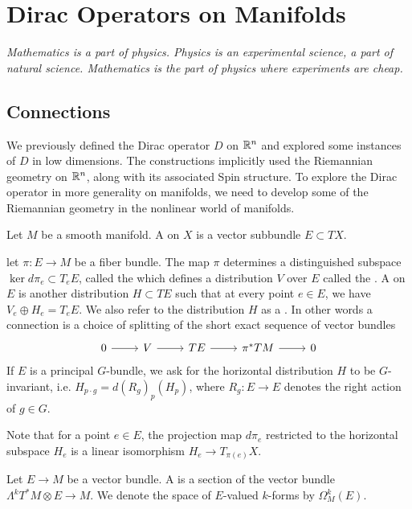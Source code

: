 \chapter{Dirac Operators on Manifolds}
%
\subsectionend $ $\\
%
\emph{Mathematics is a part of physics. Physics is an experimental science, a part of
natural science. Mathematics is the part of physics where experiments are cheap.} \\
%
%
\subsectionend
%
\section{Connections}
%
We previously defined the Dirac operator $D$ on $\mathbb{R}^n$ and explored some
instances of $D$ in low dimensions. The constructions implicitly used the
Riemannian geometry on $\mathbb{R}^n$, along with its associated Spin structure.
To explore the Dirac operator in more generality on manifolds, we need to
develop some of the Riemannian geometry in the nonlinear world of manifolds.
%
\begin{defn}
Let $M$ be a smooth manifold. A  on $X$ is a vector subbundle
$E \subset TX$.
\end{defn}
%
\begin{defn}
let $\pi : E \to M$ be a fiber bundle. The map $\pi$ determines a distinguished
subspace $\ker d\pi_e \subset T_eE$, called the 
which defines a distribution $V$ over $E$ called the .
A  on $E$ is another distribution $H \subset TE$ such that
at every point $e \in E$, we have $V_e \oplus H_e = T_eE$. We also refer to the
distribution $H$ as a . In other words a connection
is a choice of splitting of the short exact sequence of vector bundles
\[\begin{tikzcd}
0 \ar[r] & V \ar[r] & TE \ar[r] & \pi^*TM \ar[r] & 0
\end{tikzcd}\]
If $E$ is a principal $G$-bundle, we ask for the horizontal distribution $H$
to be $G$-invariant, i.e. $H_{p \cdot g} = d(R_g)_p(H_p)$, where $R_g : E \to E$
denotes the right action of $g \in G$.
\end{defn}
%
Note that for a point $e \in E$, the projection map $d\pi_e$ restricted to
the horizontal subspace $H_e$ is a linear isomorphism $H_e \to T_{\pi(e)}X$.
%
\begin{defn}
Let $E \to M$ be a vector bundle. A  is a section of
the vector bundle $\Lambda^kT^*M \otimes E \to M$. We denote the space of
$E$-valued $k$-forms by $\Omega_M^k(E)$.
\end{defn}
